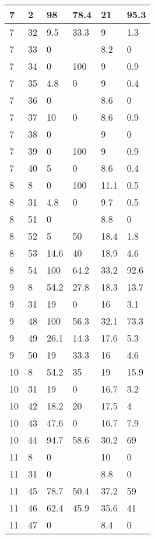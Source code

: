 \begin{longtable}[c]{ | p{2cm} | p{2cm} | p{2cm} | p{2cm} | p{3cm} | p{3cm} | }
	\hline
	\hline
	\hline
	7 & 2 & 98 & 78.4 & 21 & 95.3 \\
	\hline
	7 & 32 & 9.5 & 33.3 & 9 & 1.3 \\
	\hline
	7 & 33 & 0 &  & 8.2 & 0 \\
	\hline
	7 & 34 & 0 & 100 & 9 & 0.9 \\
	\hline
	7 & 35 & 4.8 & 0 & 9 & 0.4 \\
	\hline
	7 & 36 & 0 &  & 8.6 & 0 \\
	\hline
	7 & 37 & 10 & 0 & 8.6 & 0.9 \\
	\hline
	7 & 38 & 0 &  & 9 & 0 \\
	\hline
	7 & 39 & 0 & 100 & 9 & 0.9 \\
	\hline
	7 & 40 & 5 & 0 & 8.6 & 0.4 \\
	\hline
	\hline
	\hline
	8 & 8 & 0 & 100 & 11.1 & 0.5 \\
	\hline
	8 & 31 & 4.8 & 0 & 9.7 & 0.5 \\
	\hline
	8 & 51 & 0 &  & 8.8 & 0 \\
	\hline
	8 & 52 & 5 & 50 & 18.4 & 1.8 \\
	\hline
	8 & 53 & 14.6 & 40 & 18.9 & 4.6 \\
	\hline
	8 & 54 & 100 & 64.2 & 33.2 & 92.6 \\
	\hline
	\hline
	\hline
	9 & 8 & 54.2 & 27.8 & 18.3 & 13.7 \\
	\hline
	9 & 31 & 19 & 0 & 16 & 3.1 \\
	\hline
	9 & 48 & 100 & 56.3 & 32.1 & 73.3 \\
	\hline
	9 & 49 & 26.1 & 14.3 & 17.6 & 5.3 \\
	\hline
	9 & 50 & 19 & 33.3 & 16 & 4.6 \\
	\hline
	\hline
	\hline
	10 & 8 & 54.2 & 35 & 19 & 15.9 \\
	\hline
	10 & 31 & 19 & 0 & 16.7 & 3.2 \\
	\hline
	10 & 42 & 18.2 & 20 & 17.5 & 4 \\
	\hline
	10 & 43 & 47.6 & 0 & 16.7 & 7.9 \\
	\hline
	10 & 44 & 94.7 & 58.6 & 30.2 & 69 \\
	\hline
	\hline
	\hline
	11 & 8 & 0 &  & 10 & 0 \\
	\hline
	11 & 31 & 0 &  & 8.8 & 0 \\
	\hline
	11 & 45 & 78.7 & 50.4 & 37.2 & 59 \\
	\hline
	11 & 46 & 62.4 & 45.9 & 35.6 & 41 \\
	\hline
	11 & 47 & 0 &  & 8.4 & 0 \\
	\hline

\end{longtable}
